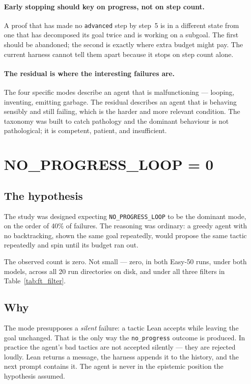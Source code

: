 \paragraph{Early stopping should key on progress, not on step count.}
A proof that has made no \texttt{advanced} step by step~5 is in a different
state from one that has decomposed its goal twice and is working on a subgoal.
The first should be abandoned; the second is exactly where extra budget might
pay. The current harness cannot tell them apart because it stops on step count
alone.

\paragraph{The residual is where the interesting failures are.}
The four specific modes describe an agent that is malfunctioning --- looping,
inventing, emitting garbage. The residual describes an agent that is behaving
sensibly and still failing, which is the harder and more relevant condition.
The taxonomy was built to catch pathology and the dominant behaviour is not
pathological; it is competent, patient, and insufficient.

\section{NO\_PROGRESS\_LOOP = 0}
\label{sec:ft_zero}

\subsection{The hypothesis}

The study was designed expecting \texttt{NO\_PROGRESS\_LOOP} to be the dominant
mode, on the order of 40\% of failures. The reasoning was ordinary: a greedy
agent with no backtracking, shown the same goal repeatedly, would propose the
same tactic repeatedly and spin until its budget ran out.

The observed count is zero. Not small --- zero, in both Easy-50 runs, under both
models, across all 20 run directories on disk, and under all three filters in
Table~\ref{tab:ft_filter}.

\subsection{Why}

The mode presupposes a \emph{silent} failure: a tactic Lean accepts while
leaving the goal unchanged. That is the only way the \texttt{no\_progress}
outcome is produced. In practice the agent's bad tactics are not accepted
silently --- they are rejected loudly. Lean returns a message, the harness
appends it to the history, and the next prompt contains it. The agent is never
in the epistemic position the hypothesis assumed.

